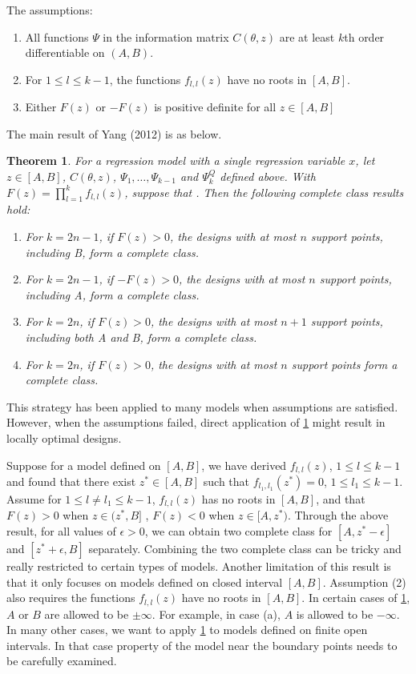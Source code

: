\documentclass[11pt]{amsart}
\newtheorem{theorem}{Theorem}[section]
\theoremstyle{definition}
\theoremstyle{remark}
\begin{document}
The assumptions:
\begin{enumerate}
\item All functions $\Psi$ in the information matrix $C(\theta,z)$ are at least $k$th order differentiable on $(A,B)$.
\item For $1\le l\le k-1$, the functions $f_{l,l}(z)$ have no roots in $[A,B]$.
\item Either $F(z)$ or $-F(z)$ is positive definite for all $z\in [A,B]$
\end{enumerate} 

The main result of Yang (2012) is as below.

\begin{theorem}\label{2012}
For a regression model with a single regression variable $x$, let $z\in[A,B]$, $C(\theta,z)$, $\Psi_1,\ldots, \Psi_{k-1}$ and $\Psi_k^Q$ defined above. With  $F(z) = \prod_{l=1}^k f_{l,l}(z)$, suppose that . Then the following complete class results hold:\begin{enumerate}
\item[(a)] For $k = 2n-1$, if $F(z)>0$, the designs with at most $n$ support points, including B, form a complete class.
\item[(b)] For $k = 2n-1$, if $-F(z)>0$, the designs with at most $n$ support points, including A, form a complete class.
\item[(c)] For $k = 2n$, if $F(z)>0$, the designs with at most $n+1$ support points, including both A and B, form a complete class.
\item[(d)] For $k = 2n$, if $F(z)>0$, the designs with at most $n$ support points form a complete class.
\end{enumerate}
\end{theorem}

 This strategy has been applied to many models when assumptions are satisfied. However, when the assumptions failed, direct application of \ref{2012} might result in locally optimal designs. 
 
 
 Suppose for a model defined on $[A,B]$, we have derived $f_{l,l}(z)$, $1\le l\le k-1$ and found that there exist $z^*\in[A,B]$ such that $f_{l_1,l_1}(z^*) = 0$, $1\le l_1\le k-1$. Assume for $1\le l\ne l_1\le k-1$, $f_{l,l}(z)$ has no roots in $[A,B]$, and that $F(z)>0$ when $z\in (z^*,B]$ , $F(z)<0$ when $z\in [A,z^*)$. Through the above result, for all values of $\epsilon >0 $, we can obtain two complete class for $ [A,z^*-\epsilon]$ and $[z^*+\epsilon,B]$ separately. Combining the two complete class can be tricky and really restricted to certain types of models. Another limitation of this result is that it only focuses on models defined on closed interval $[A,B]$. Assumption (2) also requires the functions $f_{l,l}(z)$ have no roots in $[A,B]$. In certain cases of \ref{2012}, $A$ or $B$ are allowed to be $\pm\infty$. For example, in case (a), $A$ is allowed to be $-\infty$. In many other cases, we want to apply \ref{2012} to models defined on finite open intervals. In that case property of the model near the boundary points needs to be carefully examined.
\end{document}
